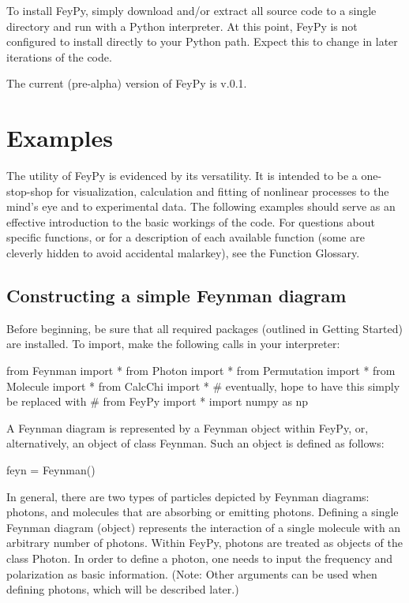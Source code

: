 \documentclass[11pt,a4paper,notitlepage]{article}
\begin{document}
To install FeyPy, simply download and/or extract all source code to a single directory and run with a Python interpreter. At this point, FeyPy is not configured to install directly to your Python path. Expect this to change in later iterations of the code.

The current (pre-alpha) version of FeyPy is v.0.1.

\section{Examples}

The utility of FeyPy is evidenced by its versatility. It is intended to be a one-stop-shop for visualization, calculation and fitting of nonlinear processes to the mind's eye and to experimental data. The following examples should serve as an effective introduction to the basic workings of the code. For questions about specific functions, or for a description of each available function (some are cleverly hidden to avoid accidental malarkey), see the Function Glossary.

\subsection{Constructing a simple Feynman diagram}

Before beginning, be sure that all required packages (outlined in Getting Started) are installed. To import, make the following calls in your interpreter:

\begin{code}
from Feynman import *
from Photon import *
from Permutation import *
from Molecule import *
from CalcChi import *
# eventually, hope to have this simply be replaced with
# from FeyPy import *
import numpy as np
\end{code} 

A Feynman diagram is represented by a Feynman object within FeyPy, or, alternatively, an object of class Feynman. Such an object is defined as follows:

\begin{code}
feyn = Feynman()
\end{code}

In general, there are two types of particles depicted by Feynman diagrams: photons, and molecules that are absorbing or emitting photons. Defining a single Feynman diagram (object) represents the interaction of a single molecule with an arbitrary number of photons. Within FeyPy, photons are treated as objects of the class Photon. In order to define a photon, one needs to input the frequency and polarization as basic information. (Note: Other arguments can be used when defining photons, which will be described later.)
\end{document}
